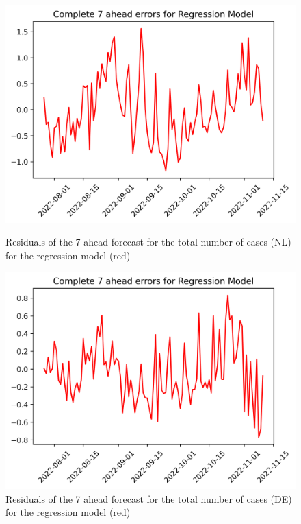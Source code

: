 \begin{figure}

\begin{minipage}{.45\textwidth}
  \centering
  \includegraphics[width=\linewidth]{pics/7_ah/7_ahead_errors_Regression Model.png}
  \caption{Residuals of the 7 ahead forecast for the total number of cases (NL) for the regression model (red)}
  \label{fig:tot_cases_error_7_RM}
\end{minipage}
\begin{minipage}{.45\textwidth}
  \centering
  \includegraphics[width=\linewidth]{pics/7_ah/DE_7_ahead_errors_Regression Model.png}
  \caption{Residuals of the 7 ahead forecast for the total number of cases (DE) for the regression model (red)}
  \label{fig:tot_cases_error_7_RM_DE}
\end{minipage}

\end{figure}
